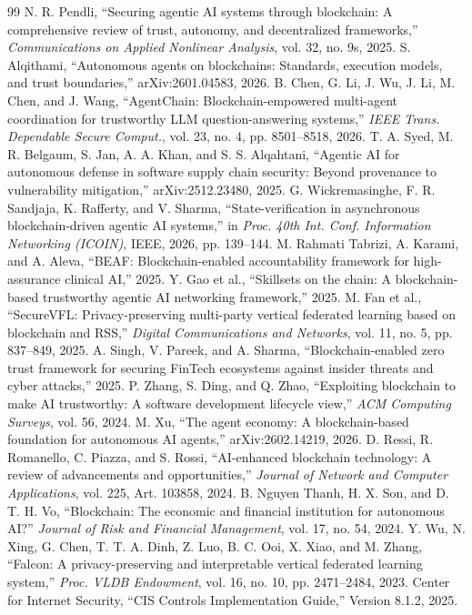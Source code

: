 \documentclass[10pt, conference]{IEEEtran}
\begin{document}
\begin{thebibliography}{99}
N. R. Pendli,
``Securing agentic AI systems through blockchain: A comprehensive review of trust, autonomy, and decentralized frameworks,''
\textit{Communications on Applied Nonlinear Analysis}, vol. 32, no. 9s, 2025.
S. Alqithami,
``Autonomous agents on blockchains: Standards, execution models, and trust boundaries,''
arXiv:2601.04583, 2026.
B. Chen, G. Li, J. Wu, J. Li, M. Chen, and J. Wang,
``AgentChain: Blockchain-empowered multi-agent coordination for trustworthy LLM question-answering systems,''
\textit{IEEE Trans. Dependable Secure Comput.}, vol. 23, no. 4, pp. 8501--8518, 2026.
T. A. Syed, M. R. Belgaum, S. Jan, A. A. Khan, and S. S. Alqahtani,
``Agentic AI for autonomous defense in software supply chain security: Beyond provenance to vulnerability mitigation,''
arXiv:2512.23480, 2025.
G. Wickremasinghe, F. R. Sandjaja, K. Rafferty, and V. Sharma,
``State-verification in asynchronous blockchain-driven agentic AI systems,''
in \textit{Proc. 40th Int. Conf. Information Networking (ICOIN)}, IEEE, 2026, pp. 139--144.
M. Rahmati Tabrizi, A. Karami, and A. Aleva,
``BEAF: Blockchain-enabled accountability framework for high-assurance clinical AI,''
2025.
Y. Gao et al.,
``Skillsets on the chain: A blockchain-based trustworthy agentic AI networking framework,''
2025.
M. Fan et al.,
``SecureVFL: Privacy-preserving multi-party vertical federated learning based on blockchain and RSS,''
\textit{Digital Communications and Networks}, vol. 11, no. 5, pp. 837--849, 2025.
A. Singh, V. Pareek, and A. Sharma,
``Blockchain-enabled zero trust framework for securing FinTech ecosystems against insider threats and cyber attacks,''
2025.
P. Zhang, S. Ding, and Q. Zhao,
``Exploiting blockchain to make AI trustworthy: A software development lifecycle view,''
\textit{ACM Computing Surveys}, vol. 56, 2024.
M. Xu,
``The agent economy: A blockchain-based foundation for autonomous AI agents,''
arXiv:2602.14219, 2026.
D. Ressi, R. Romanello, C. Piazza, and S. Rossi,
``AI-enhanced blockchain technology: A review of advancements and opportunities,''
\textit{Journal of Network and Computer Applications}, vol. 225, Art. 103858, 2024.
B. Nguyen Thanh, H. X. Son, and D. T. H. Vo,
``Blockchain: The economic and financial institution for autonomous AI?''
\textit{Journal of Risk and Financial Management}, vol. 17, no. 54, 2024.
Y. Wu, N. Xing, G. Chen, T. T. A. Dinh, Z. Luo, B. C. Ooi, X. Xiao, and M. Zhang,
``Falcon: A privacy-preserving and interpretable vertical federated learning system,''
\textit{Proc. VLDB Endowment}, vol. 16, no. 10, pp. 2471--2484, 2023.
Center for Internet Security,
``CIS Controls Implementation Guide,''
Version 8.1.2, 2025.


\end{thebibliography}
\end{document}
